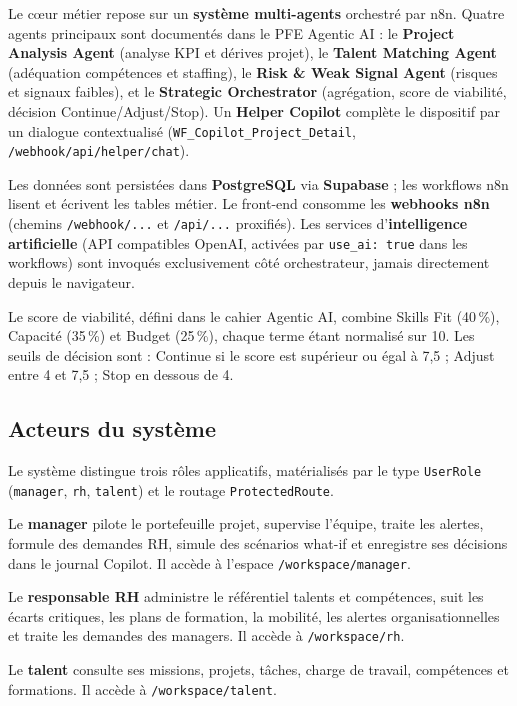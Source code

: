 Le cœur métier repose sur un \textbf{système multi-agents} orchestré par n8n. Quatre agents principaux sont documentés dans le PFE Agentic AI : le \textbf{Project Analysis Agent} (analyse KPI et dérives projet), le \textbf{Talent Matching Agent} (adéquation compétences et staffing), le \textbf{Risk \& Weak Signal Agent} (risques et signaux faibles), et le \textbf{Strategic Orchestrator} (agrégation, score de viabilité, décision Continue/Adjust/Stop). Un \textbf{Helper Copilot} complète le dispositif par un dialogue contextualisé (\texttt{WF\_Copilot\_Project\_Detail}, \texttt{/webhook/api/helper/chat}).

Les données sont persistées dans \textbf{PostgreSQL} via \textbf{Supabase} ; les workflows n8n lisent et écrivent les tables métier. Le front-end consomme les \textbf{webhooks n8n} (chemins \texttt{/webhook/...} et \texttt{/api/...} proxifiés). Les services d'\textbf{intelligence artificielle} (API compatibles OpenAI, activées par \texttt{use\_ai: true} dans les workflows) sont invoqués exclusivement côté orchestrateur, jamais directement depuis le navigateur.

Le score de viabilité, défini dans le cahier Agentic AI, combine Skills Fit (40\,\%), Capacité (35\,\%) et Budget (25\,\%), chaque terme étant normalisé sur 10. Les seuils de décision sont : Continue si le score est supérieur ou égal à 7,5 ; Adjust entre 4 et 7,5 ; Stop en dessous de 4.

\subsection{Acteurs du système}

Le système distingue trois rôles applicatifs, matérialisés par le type \texttt{UserRole} (\texttt{manager}, \texttt{rh}, \texttt{talent}) et le routage \texttt{ProtectedRoute}.

Le \textbf{manager} pilote le portefeuille projet, supervise l'équipe, traite les alertes, formule des demandes RH, simule des scénarios what-if et enregistre ses décisions dans le journal Copilot. Il accède à l'espace \texttt{/workspace/manager}.

Le \textbf{responsable RH} administre le référentiel talents et compétences, suit les écarts critiques, les plans de formation, la mobilité, les alertes organisationnelles et traite les demandes des managers. Il accède à \texttt{/workspace/rh}.

Le \textbf{talent} consulte ses missions, projets, tâches, charge de travail, compétences et formations. Il accède à \texttt{/workspace/talent}.

